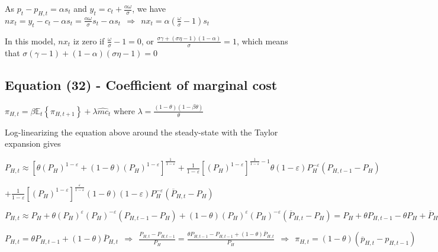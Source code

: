 \documentclass[
]{article}
\begin{document}
As \(p_t-p_{H,t}=\alpha s_t\) and
\(\displaystyle y_t = c_t+\frac{\alpha \omega}{\sigma}\), we have
\(\displaystyle nx_t=y_t-c_t-\alpha s_t= \frac{\alpha \omega}{\sigma}s_t - \alpha s_t \ \ \Rightarrow \ \ nx_t = \alpha \left(\frac{\omega}{\sigma} - 1 \right) s_t\)

In this model, \(nx_t\) iz zero if
\(\displaystyle \frac{\omega}{\sigma} - 1=0\), or
\(\displaystyle \frac{\sigma \gamma + (\sigma \eta - 1)(1-\alpha)}{\sigma}=1\),
which means that \(\sigma (\gamma-1) + (1-\alpha)(\sigma \eta - 1)=0\)

\vspace{12pt}

\hypertarget{equation-32---coefficient-of-marginal-cost}{%
\subsection{Equation (32) - Coefficient of marginal
cost}\label{equation-32---coefficient-of-marginal-cost}}

\(\pi_{H,t} = \beta \mathbb{E}_t \left\{ \pi_{H,t+1}\right\}+ \lambda\widehat{mc}_t\)
where
\(\displaystyle \lambda = \frac{(1-\theta) (1-\beta \theta)}{\theta}\)

\vspace{8pt}

Log-linearizing the equation above around the steady-state with the
Taylor expansion gives

\(\displaystyle P_{H,t} \approx [\theta(P_H)^{1-\varepsilon} + (1-\theta)(P_H)^{1-\varepsilon}]^{\frac{1}{1-\varepsilon}} + \frac{1}{1-\varepsilon} \left[ (P_H)^{1-\varepsilon} \right]^{\frac{1}{1-\varepsilon}-1} \theta(1-\varepsilon) P_H^{-\varepsilon} (P_{H,t-1}-P_H)\)

\(\displaystyle + \frac{1}{1-\varepsilon} \left[ (P_H)^{1-\varepsilon} \right]^{\frac{\varepsilon}{1-\varepsilon}} (1-\theta)(1-\varepsilon) P_H^{-\varepsilon} (\overline{P}_{H,t}-P_H)\)

\(\displaystyle P_{H,t} \approx P_H + \theta(P_H)^{\varepsilon}(P_H)^{-\varepsilon} (P_{H,t-1}-P_H) + (1-\theta)(P_H)^{\varepsilon}(P_H)^{-\varepsilon} (\overline{P}_{H,t}-P_H)=P_H+\theta P_{H,t-1} -\theta P_H +\overline{P}_{H,t}-P_H - \theta \overline{P}_{H,t} + \theta P_H\)

\(\displaystyle P_{H,t} = \theta P_{H,t-1} + (1-\theta) \overline{P}_{H,t} \ \ \Rightarrow \ \ \frac{P_{H,t}-P_{H,t-1}}{P_H} = \frac{\theta P_{H,t-1} - P_{H,t-1} + (1-\theta) \overline{P}_{H,t}}{P_H} \ \ \Rightarrow \ \ \pi_{H,t}=(1-\theta)(\overline{p}_{H,t}-p_{H,t-1})\)
\end{document}
